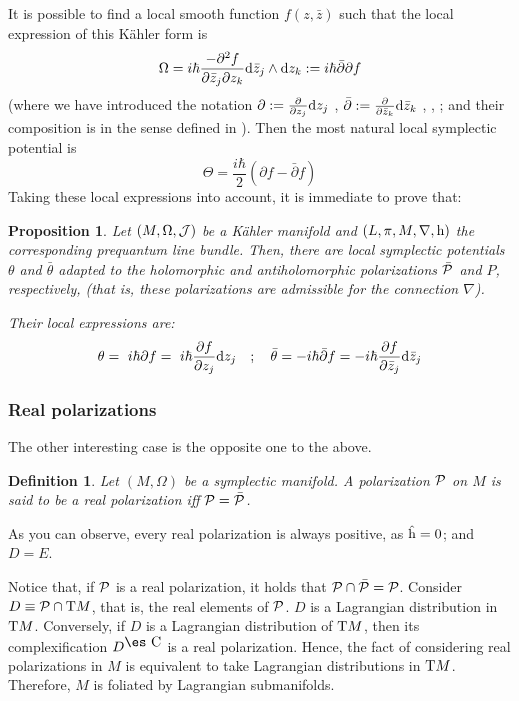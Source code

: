 \documentclass[12pt]{article}
\newtheorem{prop}{Proposition}
\newtheorem{definition}{Definition}
\def\dst{\(}
\def\derpar#1#2{\frac{\partial{#1}}{\partial{#2}}}
\def\d{{\rm d}}
\def\P{{\cal P}}
\def\h{{\rm h}}
\def\Complex{\mbox{\es C}}
\def\Tan{{\rm T}}
\begin{document}
It is possible to find a local smooth function $f(z,\bar z)$
such that the local expression of this K\"ahler form is
$$
\Omega=i \hbar\frac{-\partial^2 f}{\partial \bar z_j \partial z_k}
\d \bar z_j \wedge \d z_k
:= i \hbar \bar \partial \partial f
$$
(where we have introduced the notation
\dst\partial := \derpar{}{z_j}\d z_j\) ,
\dst\bar \partial := \derpar{}{\bar z_k}\d \bar z_k\)
\cite{KN-69}, \cite{MK-71}, \cite{Ok-87};
and their composition is in the sense defined in \cite{Wl-85}).
Then the most natural local symplectic potential is
$$
\Theta = \frac{i\hbar}{2}(\partial f -\bar \partial f)
$$
Taking these local expressions into account,
it is immediate to prove that:

\begin{prop}
Let $(M,\Omega ,{\cal J})$ be a K\"ahler manifold
and $(L,\pi,M,\nabla ,\h )$ the corresponding prequantum line bundle.
Then, there are local symplectic potentials
$\theta$ and $\bar \theta$ adapted to the
holomorphic and antiholomorphic polarizations
$\bar \P$ and $P$, respectively,
(that is, these polarizations are admissible
for the connection $\nabla$).

Their local expressions are:
 $$
 \theta =\ i\hbar \partial f =\ i\hbar\derpar{f}{z_j}\d z_j
 \quad ; \quad
 \bar \theta = -i\hbar \bar \partial f=
 -i\hbar\derpar{f}{\bar z_j}\d \bar z_j
 $$
\label{asp}
\end{prop}



\subsubsection{Real polarizations}


The other interesting case is the opposite one
to the above.

\begin{definition}
Let $(M,\Omega )$ be a symplectic manifold.
A polarization $\P$ on $M$ is said to be a
{\rm real polarization} iff
$\P = \bar \P$.
\end{definition}

As you can observe, every real polarization
is always positive, as $\hat\h=0$; and $D=E$.

Notice that, if ${\cal P}$ is a real polarization,
it holds that
${\cal P}\cap \bar{\cal P} = {\cal P}$.
Consider $D \equiv {\cal P} \cap \Tan M$,
that is, the real elements of ${\cal P}$.
$D$ is a Lagrangian distribution in $\Tan M$.
Conversely, if $D$ is a Lagrangian distribution of $\Tan M$,
then its complexification $D^{\Complex}$
is a real polarization.
Hence, the fact of considering real polarizations in $M$
is equivalent to take Lagrangian distributions in $\Tan M$.
Therefore, $M$ is foliated by Lagrangian submanifolds.
\end{document}

